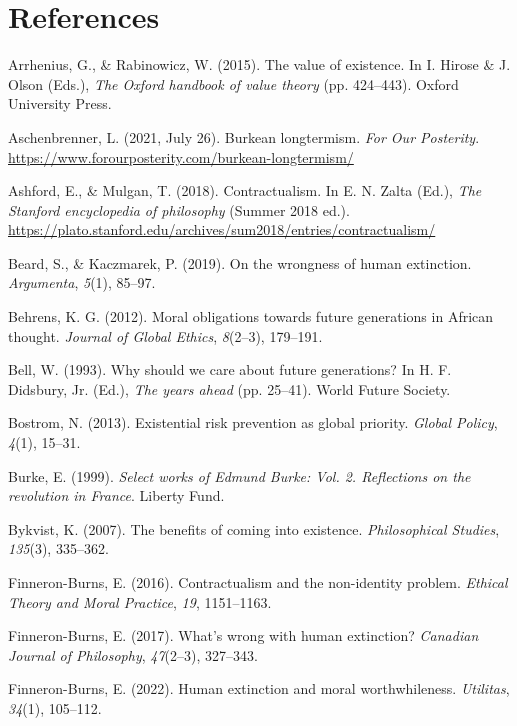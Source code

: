 \documentclass[man,11pt,a4paper]{apa7}
\begin{document}
\section{References}
\begin{list}{}{\setlength{\leftmargin}{0.5in}\setlength{\itemindent}{-0.5in}\setlength{\itemsep}{0pt}\setlength{\parsep}{0pt}}\linespread{2}\selectfont
\item Arrhenius, G., \& Rabinowicz, W. (2015). The value of existence. In I. Hirose \& J. Olson (Eds.), \textit{The Oxford handbook of value theory} (pp. 424--443). Oxford University Press.
\item Aschenbrenner, L. (2021, July 26). Burkean longtermism. \textit{For Our Posterity}. \url{https://www.forourposterity.com/burkean-longtermism/}
\item Ashford, E., \& Mulgan, T. (2018). Contractualism. In E. N. Zalta (Ed.), \textit{The Stanford encyclopedia of philosophy} (Summer 2018 ed.). \url{https://plato.stanford.edu/archives/sum2018/entries/contractualism/}
\item Beard, S., \& Kaczmarek, P. (2019). On the wrongness of human extinction. \textit{Argumenta}, \textit{5}(1), 85--97.
\item Behrens, K. G. (2012). Moral obligations towards future generations in African thought. \textit{Journal of Global Ethics}, \textit{8}(2--3), 179--191.
\item Bell, W. (1993). Why should we care about future generations? In H. F. Didsbury, Jr. (Ed.), \textit{The years ahead} (pp. 25--41). World Future Society.
\item Bostrom, N. (2013). Existential risk prevention as global priority. \textit{Global Policy}, \textit{4}(1), 15--31.
\item Burke, E. (1999). \textit{Select works of Edmund Burke: Vol. 2. Reflections on the revolution in France}. Liberty Fund.
\item Bykvist, K. (2007). The benefits of coming into existence. \textit{Philosophical Studies}, \textit{135}(3), 335--362.
\item Finneron-Burns, E. (2016). Contractualism and the non-identity problem. \textit{Ethical Theory and Moral Practice}, \textit{19}, 1151--1163.
\item Finneron-Burns, E. (2017). What's wrong with human extinction? \textit{Canadian Journal of Philosophy}, \textit{47}(2--3), 327--343.
\item Finneron-Burns, E. (2022). Human extinction and moral worthwhileness. \textit{Utilitas}, \textit{34}(1), 105--112.

\end{list}
\end{document}
